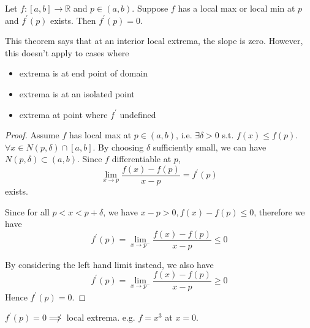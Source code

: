 
\begin{theorem}
    \label{thm:fermat}
    Let $f: [a, b] \to \mathbb{R}$ and $p \in (a, b)$.
    Suppose $f$ has a local max or local min at $p$ and
    $f^{\prime}(p)$ exists. 
    Then $f^{\prime}(p) = 0$.
\end{theorem}

\begin{remark}
    This theorem says that at an interior local extrema,
    the slope is zero. 
    However, this doesn't apply to cases where 
    \begin{itemize}
        \item extrema is at end point of domain
        \item extrema is at an isolated point
        \item extrema at point where $f^{\prime}$ undefined
    \end{itemize} 
\end{remark}

\begin{proof}
    Assume $f$ has local max at $p \in (a, b)$, 
    i.e. $\exists \delta > 0$ s.t. 
    $f(x) \leq f(p)$. $\forall x \in N(p, \delta) \cap [a, b]$. 
    By choosing $\delta$ sufficiently small, we can have 
    $N(p, \delta) \subset (a, b)$. 
    Since $f$ differentiable at $p$, 
    \[
        \lim_{x \to p} \frac{f(x) - f(p)}{x-p} = f^{\prime}(p)
    \]
    exists. 
    \medskip

    Since for all $p < x < p + \delta$, 
    we have $x - p> 0, f(x) - f(p) \leq 0$,
    therefore we have
    \[
        f^{\prime}(p) = \lim_{x \to p^{-}} \frac{f(x) - f(p)}{x - p} \leq 0
    \]

    By considering the left hand limit instead, we also have 
    \[
        f^{\prime}(p) = \lim_{x \to p^{-}} \frac{f(x) - f(p)}{x - p} \geq 0
    \]
    Hence $f^{\prime}(p) = 0 $.
\end{proof}

\begin{remark}
    $f^{\prime}(p) = 0 \not \implies $ local extrema. 
    e.g. $f = x^3$ at $x = 0$.
\end{remark}

